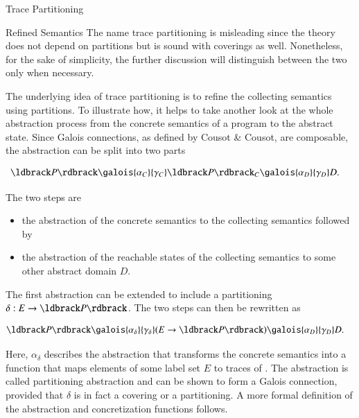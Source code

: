 \begin{chapter}{Trace Partitioning}
\begin{section}{Refined Semantics}
		The name trace partitioning is misleading since the theory does not depend on partitions but is sound with coverings as well. Nonetheless, for the sake of simplicity, the further discussion will distinguish between the two only when necessary.

		The underlying idea of trace partitioning is to refine the collecting semantics using partitions. To illustrate how, it helps to take another look at the whole abstraction process from the concrete semantics of a program to the abstract state. Since Galois connections, as defined by Cousot \& Cousot, are composable, the abstraction can be split into two parts

		\begin{align}
			\label{equation:ReachabilityAbstraction1}
			\concrete{P} \galois{\alpha_C}{\gamma_C} &\collecting{P} \galois{\alpha_D}{\gamma_D} D.
		\end{align}

		The two steps are

		\begin{itemize}
			\item the abstraction of the concrete semantics  to the collecting semantics  followed by
			\item the abstraction of the reachable states of the collecting semantics to some other abstract domain $D$.
		\end{itemize}

		The first abstraction can be extended to include a partitioning $\delta: E \to \concrete{P}$. The two steps can then be rewritten as

		\begin{align}
			\label{equation:partitionedreachabilityabstraction1}
			\concrete{P} \galois{\alpha_\delta}{\gamma_\delta} &(E \to \concrete{P}) \galois{\alpha_D}{\gamma_D} D.
		\end{align}

		Here, $\alpha_\delta$ describes the abstraction that transforms the concrete semantics into a function that maps elements of some label set $E$ to traces of . The abstraction is called partitioning abstraction and can be shown to form a Galois connection, provided that $\delta$ is in fact a covering or a partitioning. A more formal definition of the abstraction and concretization functions follows.


\end{section}
\end{chapter}
